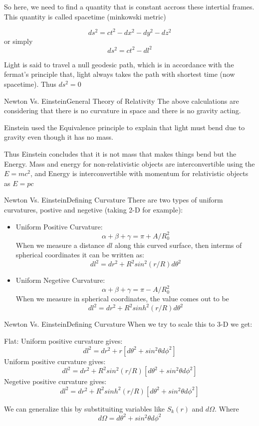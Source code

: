 \begin{frame}
	So here, we need to find a quantity that is constant accross these
	intertial frames. This quantity is called spacetime (minkowski metric)

	$$ ds^2 = ct^2 - dx^2 - dy^2 - dz^2 $$
	or simply
	$$ ds^2 = ct^2 - dl^2 $$

	Light is said to travel a null geodesic path, which is in accordance
	with the fermat's principle that, light always takes the path with
	shortest time (now spacetime). Thus $ds^2 = 0$
\end{frame}


\begin{frame}{Newton Vs. Einstein}{General Theory of Relativity}
	The above calculations are considering that there is no curvature in
	space and there is no gravity acting.

	Einstein used the
	Equivalence principle to explain that light must bend due to gravity
	even though it has no mass.

	Thus Einstein concludes that it is not mass that makes things bend but
	the Energy. Mass and energy for non-relativistic objects are
	interconvertible using the $E = mc^2$, and Energy is interconvertible
	with momentum for relativistic objects as $E = pc$
\end{frame}


\begin{frame}{Newton Vs. Einstein}{Defining Curvature}
	There are two types of uniform curvatures, postive and negetive (taking
	2-D for example):
	\begin{itemize}
		\item  Uniform Positive Curvature:
			$$ \alpha + \beta + \gamma = \pi + A/R_0^2  $$
			When we measure a distance $dl$ along this curved
			surface, then interms of spherical coordinates it can be
			written as:
			$$ dl^2 = dr^2 + R^2 sin^2(r/R)d\theta^2 $$
		\item  Uniform Negetive Curvature:
			$$ \alpha + \beta + \gamma = \pi - A/R_0^2  $$
			When we measure in spherical coordinates, the value
			comes out to be
			$$ dl^2 = dr^2 + R^2 sinh^2(r/R)d\theta^2 $$

        \end{itemize}
\end{frame}

\begin{frame}{Newton Vs. Einstein}{Defining Curvature}
	When we try to scale this to 3-D we get:

	Flat:
	Uniform positive curvature gives:
	$$ dl^2 = dr^2 + r  [d\theta^2 + sin^2 \theta d\phi^2]$$
	Uniform positive curvature gives:
	$$ dl^2 = dr^2 + R^2 sin^2(r/R)  [d\theta^2 + sin^2 \theta d\phi^2]$$
	Negetive positive curvature gives:
	$$ dl^2 = dr^2 + R^2 sinh^2(r/R)  [d\theta^2 + sin^2 \theta d\phi^2]$$

	We can generalize this by substituiting variables like $S_k(r)$ and
	$d\Omega$. Where
	$$ d\Omega = d\theta^2 + sin^2\theta d\phi^2 $$
\end{frame}

